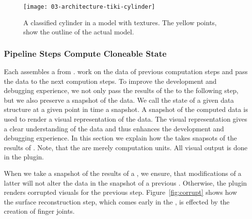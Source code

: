 \documentclass[../ClassicThesis.tex]{subfiles}
\begin{document}
\begin{figure}[h]
  \centering
  \texttt{[image: 03-architecture-tiki-cylinder]}
  \caption{A classified cylinder in a model with textures.
    The yellow points, show the outline of the actual model.}
  \label{fig:tiki-cylinder}
\end{figure}

\paragraph{}


\subsubsection{Pipeline Steps Compute Cloneable State}

Each \class{\fabmethod} assembles a  from
.  work on the
data of previous computation steps and pass the data to the
next compution steps. To improve the development and
debugging experience, we not only pass the results of the
 to the following step, but we also
preserve a snapshot of the data. We call the state of a
given data structure at a given point in time a snapshot. A
snapshot of the computed data is used to render a visual
representation of the data. The visual representation gives
a clear understanding of the data and thus enhances the
development and debugging experience. In this section we
explain how the  takes snapsots of the
results of . Note, that the
 are merely computation units. All
visual output is done in the  plugin.

When we take a snapshot of the results of a
, we ensure, that modifications of a
latter  will not alter the data in the
snapshot of a previous . Otherwise, the
 plugin renders corrupted visuals for
the previous step. Figure~\ref{fig:corrupt} shows how the surface
reconstruction step, which comes early in the
, is effected by the creation of finger
joints.
\end{document}
